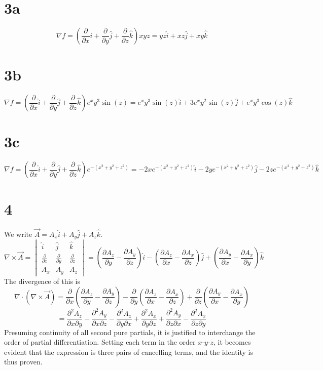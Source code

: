 \documentclass[letterpaper, 11pt]{article}
\begin{document}
\section*{3a}
\[\nabla f = \left(\frac{\partial}{\partial x}\hat{i} + \frac{\partial}{\partial y}\hat{j} + \frac{\partial}{\partial z}\hat{k}\right)xyz=yz\hat{i}+xz\hat{j}+xy\hat{k}\]

\section*{3b}
\[\nabla f = \left(\frac{\partial}{\partial x}\hat{i} + \frac{\partial}{\partial y}\hat{j} + \frac{\partial}{\partial z}\hat{k}\right)e^xy^3\sin(z)=e^xy^3\sin(z)\hat{i}+3e^xy^2\sin(z)\hat{j}+e^xy^3\cos(z)\hat{k}\]

\section*{3c}
\[\nabla f = \left(\frac{\partial}{\partial x}\hat{i} + \frac{\partial}{\partial y}\hat{j} + \frac{\partial}{\partial z}\hat{k}\right)e^{-(x^2+y^2+z^2)}=-2xe^{-(x^2+y^2+z^2)}\hat{i}-2ye^{-(x^2
    +y^2+z^2)}\hat{j}-2ze^{-(x^2+y^2+z^2)}\hat{k}\]

\section*{4}
We write $\vec{A} = A_x\hat{i}+A_y\hat{j}+A_z\hat{k}$. \[\nabla \times \vec{A} = \begin{vmatrix}\hat{i} & \hat{j} & \hat{k} \\ \frac{\partial}{\partial x} & \frac{\partial}{\partial y} & \frac{\partial}{\partial z} \\ A_x & A_y & A_z \end{vmatrix} = \left(\frac{\partial A_z}{\partial y}-\frac{\partial A_y}{\partial z}\right)\hat{i} - \left(\frac{\partial A_z}{\partial x} - \frac{\partial A_x}{\partial z}\right)\hat{j} + \left(\frac{\partial A_y}{\partial x} - \frac{\partial A_x}{\partial y}\right)\hat{k}\]
The divergence of this is \[\nabla \cdot (\nabla \times \vec{A}) = \frac{\partial}{\partial x}\left(\frac{\partial A_z}{\partial y}-\frac{\partial A_y}{\partial z}\right) - \frac{\partial}{\partial y}\left(\frac{\partial A_z}{\partial x} - \frac{\partial A_x}{\partial z}\right) + \frac{\partial}{\partial z}\left(\frac{\partial A_y}{\partial x} - \frac{\partial A_x}{\partial y}\right)\]
\[=\frac{\partial^2 A_z}{\partial x\partial y} - \frac{\partial^2 A_y}{\partial x\partial z} - \frac{\partial^2 A_z}{\partial y\partial x}+\frac{\partial^2 A_x}{\partial y\partial z} +\frac{\partial^2 A_y}{\partial z\partial x}-\frac{\partial^2 A_x}{\partial z\partial y}\]
Presuming continuity of all second pure partials, it is justified to interchange the order of partial differentiation.
Setting each term in the order $x$-$y$-$z$, it becomes evident that the expression is three pairs of cancelling terms, and the identity is thus proven.
\end{document}
